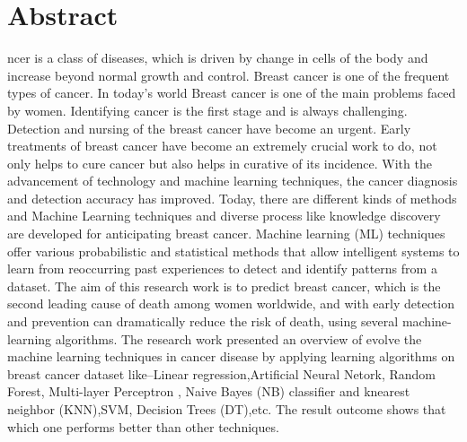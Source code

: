 \documentclass[12pt,journal,compsoc]{IEEEtran}
\begin{document}
\section{Abstract}

  ncer is a class of diseases, which is driven by
change in cells of the body and increase beyond normal
growth and control. Breast cancer is one of the frequent types
of cancer.
   In today’s world Breast cancer is one of the main
problems faced by women. Identifying cancer is the first stage and
is always challenging. 
    Detection and nursing of the breast cancer
have become an urgent. Early treatments of breast cancer have become an
extremely crucial work to do, not only helps to cure cancer but
also helps in curative of its incidence.
        With the advancement of technology and
machine learning techniques, the cancer diagnosis and
detection accuracy has improved.
        Today, there are different
kinds of methods and Machine Learning techniques and diverse process
like knowledge discovery are developed for anticipating breast
cancer.
Machine learning (ML)
techniques offer various probabilistic and statistical methods
that allow intelligent systems to learn from reoccurring past
experiences to detect and identify patterns from a dataset.
The aim of this research
work is to predict breast cancer, which is the second leading
cause of death among women worldwide, and with early detection
and prevention can dramatically reduce the risk of death, using
several machine-learning algorithms.
The research work presented an overview of evolve the
machine learning techniques in cancer disease by applying
learning algorithms on breast cancer dataset like–Linear
regression,Artificial Neural Netork, Random Forest, Multi-layer Perceptron , Naive Bayes (NB)
classifier and knearest neighbor (KNN),SVM,
Decision Trees (DT),etc. The result outcome shows that
which one performs better than other techniques.


\end{document}
